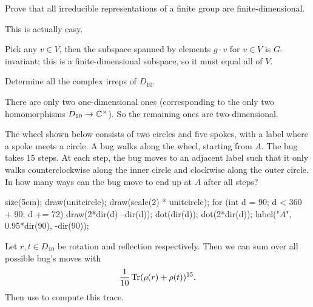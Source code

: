 \begin{problem}
	Prove that all irreducible representations
	of a finite group are finite-dimensional.
	\begin{hint}
		This is actually easy.
	\end{hint}
	\begin{sol}
		Pick any $v \in V$, then the subspace
		spanned by elements $g \cdot v$ for $v \in V$
		is $G$-invariant;
		this is a finite-dimensional subspace,
		so it must equal all of $V$.
	\end{sol}
\end{problem}

\begin{problem}
	\label{prob:dten_irrep}
	Determine all the complex irreps of $D_{10}$.
	\begin{hint}
		There are only two one-dimensional ones
		(corresponding to the only two homomorphisms $D_{10} \to \mathbb C^\times$).
		So the remaining ones are two-dimensional.
	\end{hint}
\end{problem}

\begin{problem}
	[AIME 2018]
	\gim
	The wheel shown below consists of two circles and five spokes, with a label
	where a spoke meets a circle. A bug walks along the wheel, starting from $A$.
	The bug takes $15$ steps. At each step, the bug moves to an adjacent label such
	that it only walks counterclockwise along the inner circle and clockwise along the
	outer circle. In how many ways can the bug move to end up at $A$ after all steps?
	\begin{center}
		\begin{asy}
		size(5cm);
		draw(unitcircle);
		draw(scale(2) * unitcircle);
		for (int d = 90; d < 360 + 90; d += 72) {
			draw(2*dir(d) --dir(d));
			dot(dir(d));
			dot(2*dir(d));
		}
		label("$A$", 0.95*dir(90), -dir(90));
		\end{asy}
	\end{center}
	\begin{hint}
		Let $r, t \in D_{10}$ be rotation and reflection respectively. Then we can sum over all possible bug's moves with
		\[ \frac{1}{10} \operatorname{Tr} (\rho(r) + \rho(t))^{15}. \]
		Then use  to compute this trace.
	\end{hint}
\end{problem}
